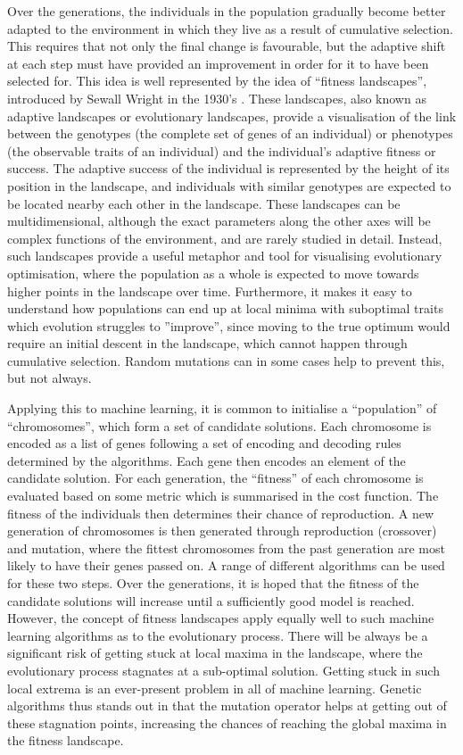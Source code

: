 \documentclass[multicolumn, 12pt]{extarticle}
\begin{document}
Over the generations, the individuals in the population gradually become better adapted to the environment in which they live as a result of cumulative selection. This requires that not only the final change is favourable, but the adaptive shift at each step must have provided an improvement in order for it to have been selected for.  This idea is well represented by the idea of ``fitness landscapes'', introduced by Sewall Wright in the 1930's \cite{Sewall}. These landscapes, also known as adaptive landscapes or evolutionary landscapes, provide a visualisation of the link between the genotypes (the complete set of genes of an individual) or phenotypes (the observable traits of an individual) and the individual's adaptive fitness or success. The adaptive success of the individual is represented by the height of its position in the landscape, and individuals with similar genotypes are expected to be located nearby each other in the landscape. These landscapes can be multidimensional, although the exact parameters along the other axes will be complex functions of the environment, and are rarely studied in detail. Instead, such landscapes provide a useful metaphor and tool for visualising evolutionary optimisation, where the population as a whole is expected to move towards higher points in the landscape over time. Furthermore, it makes it easy to understand how populations can end up at local minima with suboptimal traits which evolution struggles to ''improve'', since moving to the true optimum would require an initial descent in the landscape, which cannot happen through cumulative selection. Random mutations can in some cases help to prevent this, but not always.

Applying this to machine learning, it is common to initialise a ``population'' of ``chromosomes'', which form a set of candidate solutions. Each chromosome is encoded as a list of genes following a set of encoding and decoding rules determined by the algorithms. Each gene then encodes an element of the candidate solution. For each generation, the ``fitness'' of each chromosome is evaluated based on some metric which is summarised in the cost function. The fitness of the individuals then determines their chance of reproduction. 
A new generation of chromosomes is then generated through reproduction (crossover) and mutation, where the fittest chromosomes from the past generation are most likely to have their genes passed on. A range of different algorithms can be used for these two steps. Over the generations, it is hoped that the fitness of the candidate solutions will increase until a sufficiently good model is reached. However, the concept of fitness landscapes apply equally well to such machine learning algorithms as to the evolutionary process. There will be always be a significant risk of getting stuck at local maxima in the landscape, where the evolutionary process stagnates at a sub-optimal solution. Getting stuck in such local extrema is an ever-present problem in all of machine learning. Genetic algorithms thus stands out in that the mutation operator helps at getting out of these stagnation points, increasing the chances of reaching the global maxima in the fitness landscape. 
\end{document}
